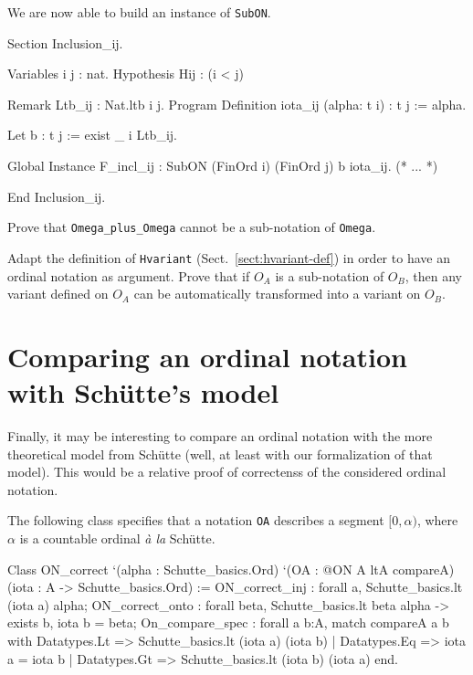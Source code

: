 \documentclass[a4paper]{book}
\begin{document}

We are now able to build an instance of \texttt{SubON}. 

\begin{Coqsrc}
Section Inclusion_ij.

  Variables i j : nat.
  Hypothesis Hij : (i < j)%

   Remark Ltb_ij : Nat.ltb i j.
   Program Definition iota_ij  (alpha: t i) : t j :=  alpha.
 
   Let b : t j := exist _ i Ltb_ij.
   
   Global Instance F_incl_ij  : SubON  (FinOrd i) (FinOrd j) b iota_ij.
  (* ... *)

  End Inclusion_ij.

\end{Coqsrc}
         


\begin{project}
Prove that \texttt{Omega\_plus\_Omega} cannot be a sub-notation of \texttt{Omega}.
\end{project}

\begin{project}
Adapt the definition of \texttt{Hvariant} (Sect.~\ref{sect:hvariant-def}) in order to
have an ordinal notation as argument. Prove that if $O_A$ is a sub-notation of $O_B$, then any variant defined on  $O_A$ can be automatically transformed into 
a variant on $O_B$.
\end{project}




\section{Comparing an ordinal notation with Schütte's model}

Finally, it may be interesting to compare an ordinal notation with the more theoretical model from Schütte (well, at least with our formalization of that model). This would be a relative proof of correctenss of the considered  ordinal  notation.

The following class specifies that a notation \texttt{OA} describes a segment $[0,\alpha)$,
where $\alpha$ is a countable ordinal \emph{à la}  Schütte.

\label{types:ON-for}

\begin{Coqsrc}
Class ON_correct `(alpha : Schutte_basics.Ord)
     `(OA : @ON A ltA  compareA)
      (iota : A -> Schutte_basics.Ord) :=
  { ON_correct_inj : forall a, Schutte_basics.lt (iota a) alpha;
    ON_correct_onto : forall beta, Schutte_basics.lt beta alpha ->
                                exists b, iota b = beta;
    On_compare_spec : forall a b:A,
        match compareA a b with
          Datatypes.Lt => Schutte_basics.lt (iota a) (iota b)
        | Datatypes.Eq => iota a = iota b
        | Datatypes.Gt => Schutte_basics.lt (iota b) (iota a)
        end}.
\end{Coqsrc}
\end{document}
